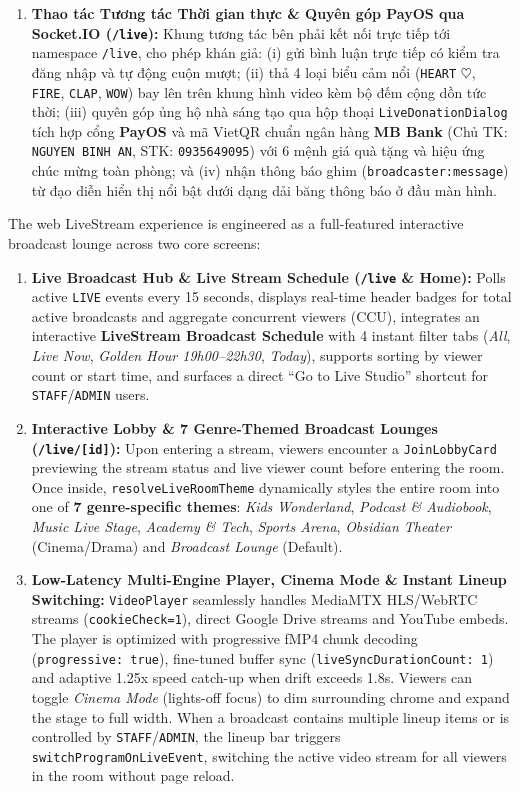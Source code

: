 {\begin{enumerate}[leftmargin=*,itemsep=2pt]
  \item \textbf{Thao tác Tương tác Thời gian thực \& Quyên góp PayOS qua Socket.IO (\texttt{/live}):} Khung tương tác bên phải kết nối trực tiếp tới namespace \texttt{/live}, cho phép khán giả: (i) gửi bình luận trực tiếp có kiểm tra đăng nhập và tự động cuộn mượt; (ii) thả 4 loại biểu cảm nổi (\texttt{HEART} $\heartsuit$, \texttt{FIRE}, \texttt{CLAP}, \texttt{WOW}) bay lên trên khung hình video kèm bộ đếm cộng dồn tức thời; (iii) quyên góp ủng hộ nhà sáng tạo qua hộp thoại \texttt{LiveDonationDialog} tích hợp cổng \textbf{PayOS} và mã VietQR chuẩn ngân hàng \textbf{MB Bank} (Chủ TK: \texttt{NGUYEN BINH AN}, STK: \texttt{0935649095}) với 6 mệnh giá quà tặng và hiệu ứng chúc mừng toàn phòng; và (iv) nhận thông báo ghim (\texttt{broadcaster:message}) từ đạo diễn hiển thị nổi bật dưới dạng dải băng thông báo ở đầu màn hình.
\end{enumerate}
}{
The web LiveStream experience is engineered as a full-featured interactive broadcast lounge across two core screens:
\begin{enumerate}[leftmargin=*,itemsep=2pt]
  \item \textbf{Live Broadcast Hub \& Live Stream Schedule (\texttt{/live} \& Home):} Polls active \texttt{LIVE} events every 15 seconds, displays real-time header badges for total active broadcasts and aggregate concurrent viewers (CCU), integrates an interactive \textbf{LiveStream Broadcast Schedule} with 4 instant filter tabs (\emph{All}, \emph{Live Now}, \emph{Golden Hour 19h00--22h30}, \emph{Today}), supports sorting by viewer count or start time, and surfaces a direct ``Go to Live Studio'' shortcut for \texttt{STAFF}/\texttt{ADMIN} users.
  \item \textbf{Interactive Lobby \& 7 Genre-Themed Broadcast Lounges (\texttt{/live/[id]}):} Upon entering a stream, viewers encounter a \texttt{JoinLobbyCard} previewing the stream status and live viewer count before entering the room. Once inside, \texttt{resolveLiveRoomTheme} dynamically styles the entire room into one of \textbf{7 genre-specific themes}: \emph{Kids Wonderland}, \emph{Podcast \& Audiobook}, \emph{Music Live Stage}, \emph{Academy \& Tech}, \emph{Sports Arena}, \emph{Obsidian Theater} (Cinema/Drama) and \emph{Broadcast Lounge} (Default).
  \item \textbf{Low-Latency Multi-Engine Player, Cinema Mode \& Instant Lineup Switching:} \texttt{VideoPlayer} seamlessly handles MediaMTX HLS/WebRTC streams (\texttt{cookieCheck=1}), direct Google Drive streams and YouTube embeds. The player is optimized with progressive fMP4 chunk decoding (\texttt{progressive: true}), fine-tuned buffer sync (\texttt{liveSyncDurationCount: 1}) and adaptive 1.25x speed catch-up when drift exceeds 1.8s. Viewers can toggle \emph{Cinema Mode} (lights-off focus) to dim surrounding chrome and expand the stage to full width. When a broadcast contains multiple lineup items or is controlled by \texttt{STAFF}/\texttt{ADMIN}, the lineup bar triggers \texttt{switchProgramOnLiveEvent}, switching the active video stream for all viewers in the room without page reload.

\end{enumerate}}

